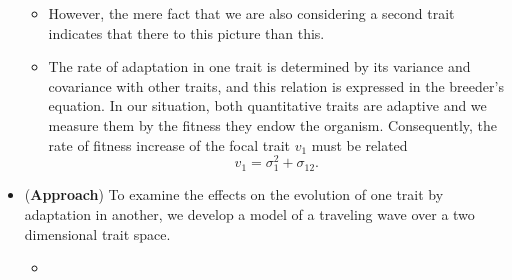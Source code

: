 \documentclass[11pt,one column]{article}
\begin{document}
\begin{itemize}
\begin{itemize}
	\item However, the mere fact that we are also considering a second trait indicates that there to this picture than this.
	\item The rate of adaptation in one trait is determined by its variance and covariance with other traits, and this relation is expressed in the breeder’s equation. In our situation, both quantitative traits are adaptive and we measure them by the fitness they endow the organism. Consequently, the rate of fitness increase of the focal trait $v_1$ must be related \[v_1=\sigma_1^2+\sigma_{12}.\]
	\end{itemize}
\item (\textbf{Approach}) To examine the effects on the evolution of one trait by adaptation in another, we develop a model of a traveling wave over a two dimensional trait space.
	\begin{itemize}
	\item 
	\end{itemize}
\end{itemize}
\end{document}
